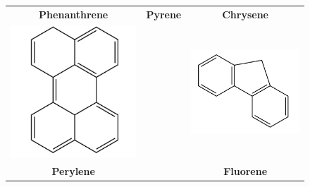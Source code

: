 \begin{figure}[p]
\begin{center}
{\begin{tabular}{c c c}
 			\textbf{Phenanthrene} & \textbf{Pyrene} & \textbf{Chrysene}\\
 			\includegraphics[scale=0.3]{image/perylene} &  &\includegraphics[scale=0.3]{image/fluorene} \\
 			\textbf{Perylene} &  & \textbf{Fluorene}\\

\end{tabular}}
\end{center}
\end{figure}
